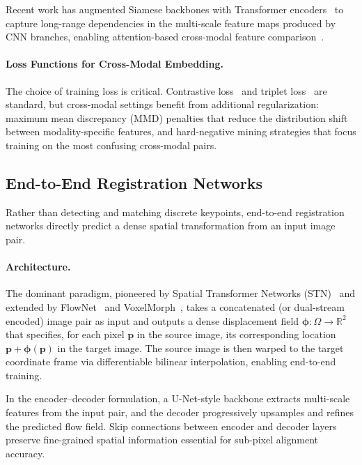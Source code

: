 Recent work has augmented Siamese backbones with Transformer
encoders~\cite{vaswani2017attention} to capture long-range dependencies in the
multi-scale feature maps produced by CNN branches, enabling attention-based
cross-modal feature comparison~\cite{deep-siamese-multilevel2024}.

\paragraph{Loss Functions for Cross-Modal Embedding.}
The choice of training loss is critical. Contrastive loss~\cite{
hadsell2006dimensionality} and triplet loss~\cite{schroff2015facenet} are
standard, but cross-modal settings benefit from additional regularization:
maximum mean discrepancy (MMD) penalties that reduce the distribution shift
between modality-specific features, and hard-negative mining strategies that
focus training on the most confusing cross-modal pairs.

\subsection{End-to-End Registration Networks}
\label{subsec:end-to-end}

Rather than detecting and matching discrete keypoints, end-to-end registration
networks directly predict a dense spatial transformation from an input image
pair.

\paragraph{Architecture.}
The dominant paradigm, pioneered by Spatial Transformer Networks
(STN)~\cite{jaderberg2015spatial} and extended by FlowNet~\cite{
dosovitskiy2015flownet} and VoxelMorph~\cite{balakrishnan2019voxelmorph},
takes a concatenated (or dual-stream encoded) image pair as input and outputs a
dense displacement field $\boldsymbol{\phi}: \Omega \to \mathbb{R}^2$ that
specifies, for each pixel $\mathbf{p}$ in the source image, its corresponding
location $\mathbf{p} + \boldsymbol{\phi}(\mathbf{p})$ in the target image. The
source image is then warped to the target coordinate frame via differentiable
bilinear interpolation, enabling end-to-end training.

In the encoder--decoder formulation, a U-Net-style backbone extracts multi-scale
features from the input pair, and the decoder progressively upsamples and
refines the predicted flow field. Skip connections between encoder and decoder
layers preserve fine-grained spatial information essential for sub-pixel
alignment accuracy.

